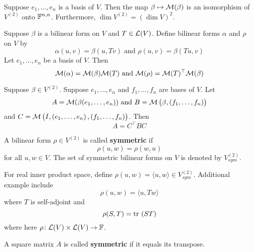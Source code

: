 \documentclass{extarticle}
\begin{document}
\begin{corollary}[\(\dim V^{(2)} = \left( \dim V \right)^2\)]
    Suppose \(e_1, \ldots, e_n\) is a basis of \(V\). Then the map \(\beta \mapsto \mathcal{M}(\beta)\) is an 
    isomorphism of \(V^{(2)}\) onto \(\mathbb{F}^{n, n}\). Furthermore, \(\dim V^{(2)} = (\dim V)^2\). 
\end{corollary}


\begin{lemma}
    Suppose \(\beta\) is a bilinear form on \(V\) and \(T \in \mathcal{L}(V)\). Define bilinear forms 
    \(\alpha\) and \(\rho\) on \(V\) by 
    \[\alpha(u, v) = \beta(u, Tv) \text{  and  } \rho(u,v) = \beta(Tu, v)\]
    Let \(e_1, \ldots, e_n\) be a basis of \(V\). Then 
    \[\mathcal{M}(\alpha) = \mathcal{M}(\beta) \mathcal{M}(T) \text{  and  } \mathcal{M}(\rho) = \mathcal{M}(T)^\top \mathcal{M}(\beta)\]
\end{lemma}

\begin{thm}
    Suppose \(\beta \in V^{(2)}\). Suppose \(e_1, \ldots, e_n\) and \(f_1, \ldots, f_n\) are bases of \(V\). 
    Let 
    \[A = \mathcal{M}(\beta (e_1, \ldots, e_n)) \text{   and   } B = \mathcal{M} \left( \beta , \left( f_1, \ldots, f_n \right) \right)\]
    and \(C = \mathcal{M} \left( I, \left( e_1, \ldots, e_n \right), \left( f_1, \ldots, f_n \right) \right)\). Then 
    \[A = C^\top B C\]
\end{thm}


\begin{definition}
    A bilinear form \(\rho \in V^{(2)}\) is called \textbf{symmetric} if 
    \[\rho (u, w) = \rho (w, u)\]
    for all \(u, w \in V\). The set of symmetric bilinear forms on \(V\) is denoted by \(V_{sym}^{(2)}\).
\end{definition}


\begin{remark}
    For real inner product space, define \(\rho (u,w) = \langle u,w \rangle \in V_{sym}^{(2)}\). Additional 
    example include 
    \[\rho (u,w) = \langle u,Tw \rangle\]
    where \(T\) is self-adjoint and  
    \[\rho (S,T) = \tr \ (ST)\]
    where here \(\rho \colon \mathcal{L}(V) \times \mathcal{L}(V) \to \mathbb{F}\).
\end{remark}


\begin{definition}
    A square matrix \(A\) is called \textbf{symmetric} if it equals its transpose. 
\end{definition}
\end{document}

